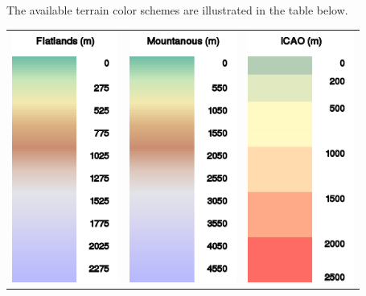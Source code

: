 \documentclass[a4paper,12pt]{refrep}
\begin{document}
\begin{maxipage}
The available terrain color schemes are illustrated in the table below.


\begin{longtable}{c c c}
\includegraphics[angle=0,width=3.5cm,keepaspectratio='true']{figures/ramp-terrain-flatlands.png}&

\includegraphics[angle=0,width=3.5cm,keepaspectratio='true']{figures/ramp-terrain-mountanous.png}&

\includegraphics[angle=0,width=3.5cm,keepaspectratio='true']{figures/ramp-terrain-icao.png}\\


\end{longtable}
\end{maxipage}
\end{document}
